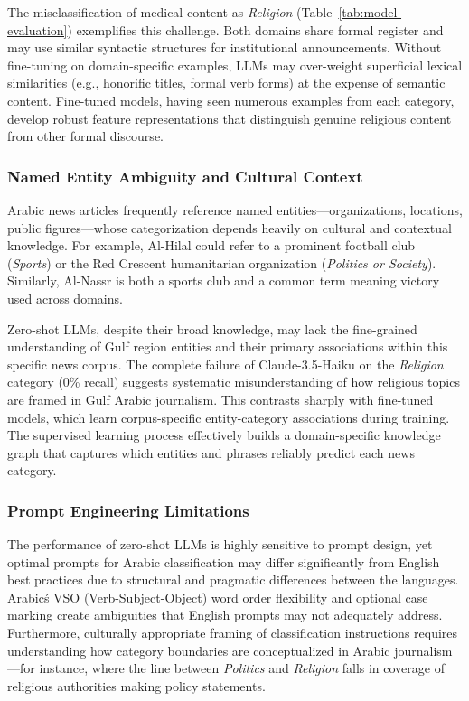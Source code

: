 \documentclass[sn-mathphys-num]{sn-jnl}
\begin{document}
The misclassification of medical content as \textit{Religion} (Table~\ref{tab:model-evaluation}) exemplifies this challenge. Both domains share formal register and may use similar syntactic structures for institutional announcements. Without fine-tuning on domain-specific examples, LLMs may over-weight superficial lexical similarities (e.g., honorific titles, formal verb forms) at the expense of semantic content. Fine-tuned models, having seen numerous examples from each category, develop robust feature representations that distinguish genuine religious content from other formal discourse.

\subsubsection{Named Entity Ambiguity and Cultural Context}

Arabic news articles frequently reference named entities---organizations, locations, public figures---whose categorization depends heavily on cultural and contextual knowledge. For example, Al-Hilal could refer to a prominent football club (\textit{Sports}) or the Red Crescent humanitarian organization (\textit{Politics or Society}). Similarly, Al-Nassr is both a sports club and a common term meaning victory used across domains.

Zero-shot LLMs, despite their broad knowledge, may lack the fine-grained understanding of Gulf region entities and their primary associations within this specific news corpus. The complete failure of Claude-3.5-Haiku on the \textit{Religion} category (0\% recall) suggests systematic misunderstanding of how religious topics are framed in Gulf Arabic journalism. This contrasts sharply with fine-tuned models, which learn corpus-specific entity-category associations during training. The supervised learning process effectively builds a domain-specific knowledge graph that captures which entities and phrases reliably predict each news category.

\subsubsection{Prompt Engineering Limitations}

The performance of zero-shot LLMs is highly sensitive to prompt design, yet optimal prompts for Arabic classification may differ significantly from English best practices due to structural and pragmatic differences between the languages. Arabic\'s VSO (Verb-Subject-Object) word order flexibility and optional case marking create ambiguities that English prompts may not adequately address. Furthermore, culturally appropriate framing of classification instructions requires understanding how category boundaries are conceptualized in Arabic journalism---for instance, where the line between \textit{Politics} and \textit{Religion} falls in coverage of religious authorities making policy statements.
\end{document}
